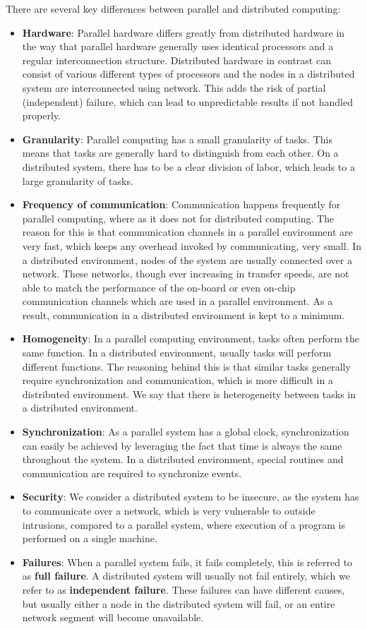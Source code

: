 \documentclass[a4paper]{article}
\begin{document}
There are several key differences between parallel and distributed computing:
\begin{itemize}
\item \textbf{Hardware}: Parallel hardware differs greatly from distributed hardware in the way that parallel hardware generally uses identical processors and a regular interconnection structure. Distributed hardware in contrast can consist of various different types of processors and the nodes in a distributed system are interconnected using network. This adds the risk of partial (independent) failure, which can lead to unpredictable results if not handled properly.
\item \textbf{Granularity}: Parallel computing has a small granularity of tasks. This means that tasks are generally hard to distinguish from each other. On a distributed system, there has to be a clear division of labor, which leads to a large granularity of tasks.
\item \textbf{Frequency of communication}: Communication happens frequently for parallel computing, where as it does not for distributed computing. The reason for this is that communication channels in a parallel environment are very fast, which keeps any overhead invoked by communicating, very small. In a distributed environment, nodes of the system are usually connected over a network. These networks, though ever increasing in transfer speeds, are not able to match the performance of the on-board or even on-chip communication channels which are used in a parallel environment. As a result, communication in a distributed environment is kept to a minimum.
\item \textbf{Homogeneity}: In a parallel computing environment, tasks often perform the same function. In a distributed environment, usually tasks will perform different functions. The reasoning behind this is that similar tasks generally require synchronization and communication, which is more difficult in a distributed environment. We say that there is heterogeneity between tasks in a distributed environment.
\item \textbf{Synchronization}: As a parallel system has a global clock, synchronization can easily be achieved by leveraging the fact that time is always the same throughout the system. In a distributed environment, special routines and communication are required to synchronize events.
\item \textbf{Security}: We consider a distributed system to be insecure, as the system has to communicate over a network, which is very vulnerable to outside intrusions, compared to a parallel system, where execution of a program is performed on a single machine.
\item \textbf{Failures}: When a parallel system fails, it fails completely, this is referred to as \textbf{full failure}.  A distributed system will usually not fail entirely, which we refer to as \textbf{independent failure}. These failures can have different causes, but usually either a node in the distributed system will fail, or an entire network segment will become unavailable.
\end{itemize}
\end{document}
